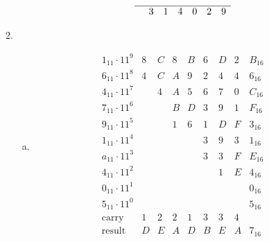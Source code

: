 \documentclass[a4paper, 10pt]{article}
\begin{document}
\begin{enumerate}
\begin{enumerate}[1.]
\begin{enumerate}[(a)]
\[\begin{array}{ccccccc}
					                  \hline
					                    & 3 & 1 & 4 & 0 & 2 & 9 \\
				                  \end{array}
			                  \]
		            \end{enumerate}
		      \item \begin{enumerate}[(a)]
			            \item \[
				                  \begin{array}{c|cccccccc}
					                  1_{11} \cdot 11^{9} & 8 & C & 8 & B & 6 & D & 2 & B_{16} \\
					                  6_{11} \cdot 11^{8} & 4 & C & A & 9 & 2 & 4 & 4 & 6_{16} \\
					                  4_{11} \cdot 11^{7} &   & 4 & A & 5 & 6 & 7 & 0 & C_{16} \\
					                  7_{11} \cdot 11^{6} &   &   & B & D & 3 & 9 & 1 & F_{16} \\
					                  9_{11} \cdot 11^{5} &   &   & 1 & 6 & 1 & D & F & 3_{16} \\
					                  1_{11} \cdot 11^{4} &   &   &   &   & 3 & 9 & 3 & 1_{16} \\
					                  a_{11} \cdot 11^{3} &   &   &   &   & 3 & 3 & F & E_{16} \\
					                  4_{11} \cdot 11^{2} &   &   &   &   &   & 1 & E & 4_{16} \\
					                  0_{11} \cdot 11^{1} &   &   &   &   &   &   &   & 0_{16} \\
					                  5_{11} \cdot 11^{0} &   &   &   &   &   &   &   & 5_{16} \\
					                  \hline
					                  \text{carry}        & 1 & 2 & 2 & 1 & 3 & 3 & 4 &        \\
					                  \text{result}       & D & E & A & D & B & E & A & 7_{16} \\
				                  \end{array}
			                  \]
		            \end{enumerate}
	      \end{enumerate}
\end{enumerate}
\end{document}
